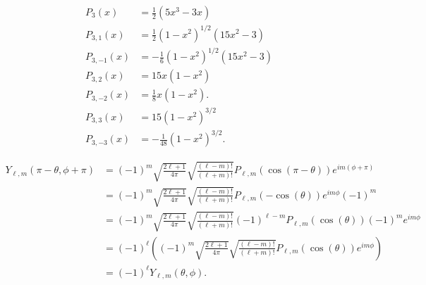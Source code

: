 \documentclass[10pt]{mypackage}
\begin{document}
\begin{solution}[35.10]
  \begin{align*}
    P_{3}\left( x \right) &= \frac{1}{2}\left( 5x^3 - 3x \right)\\
    P_{3,1}\left( x \right) &= \frac{1}{2}\left( 1-x^2 \right)^{1/2}\left( 15x^2 - 3 \right)\\
    P_{3,-1}\left( x \right) &= -\frac{1}{6}\left( 1-x^2 \right)^{1/2}\left( 15x^2 - 3 \right)\\
    P_{3,2} \left( x \right)  &= 15x\left( 1-x^2 \right)\\
    P_{3,-2}\left( x \right) &= \frac{1}{8}x\left( 1-x^2 \right).\\
    P_{3,3}\left( x \right) &= 15\left( 1-x^2 \right)^{3/2}\\
    P_{3,-3}\left( x \right) &= -\frac{1}{48}\left( 1-x^2 \right)^{3/2}.
  \end{align*}
\end{solution}
\begin{solution}[35.11]
  \begin{align*}
    Y_{\ell,m}\left( \pi-\theta,\phi + \pi \right)  &= \left( -1 \right)^{m}\sqrt{\frac{2\ell + 1}{4\pi}}\sqrt{\frac{\left( \ell-m \right)!}{\left( \ell + m \right)!}}P_{\ell,m}\left( \cos\left( \pi-\theta \right) \right)e^{im\left( \phi + \pi \right)}\\
                                                    &= \left( -1 \right)^{m}\sqrt{\frac{2\ell + 1}{4\pi}}\sqrt{\frac{\left( \ell - m \right)!}{\left( \ell + m \right)!}}P_{\ell,m}\left( -\cos\left( \theta \right) \right)e^{im\phi}\left( -1 \right)^{m}\\
                                                    &= \left( -1 \right)^{m}\sqrt{\frac{2\ell + 1}{4\pi}}\sqrt{\frac{\left( \ell - m \right)!}{\left( \ell + m \right)!}}\left( -1 \right)^{\ell -m}P_{\ell,m}\left( \cos\left( \theta \right) \right)\left( -1 \right)^{m}e^{im\phi}\\
                                                    &= \left( -1 \right)^{\ell}\left( \left( -1 \right)^{m}\sqrt{\frac{2\ell + 1}{4\pi}}\sqrt{\frac{\left( \ell - m \right)!}{\left( \ell + m \right)!}}P_{\ell,m}\left( \cos\left( \theta \right) \right)e^{im\phi} \right)\\
                                                    &= \left( -1 \right)^{\ell}Y_{\ell,m}\left( \theta,\phi \right).
  \end{align*}
  
\end{solution}
\begin{solution}[35.12]

\end{solution}
\begin{solution}[35.16]

\end{solution}
\begin{solution}[35.17 (c)]

\end{solution}
\begin{solution}[35.21]

\end{solution}
\begin{solution}[35.25]

\end{solution}
\end{document}
